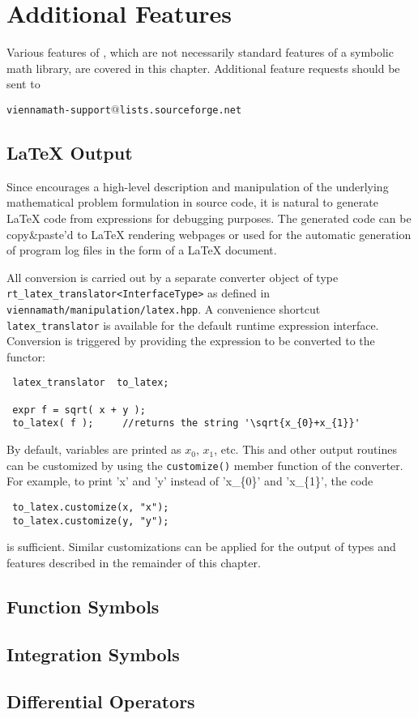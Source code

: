 
\chapter{Additional Features}
Various features of {\ViennaMath}, which are not necessarily standard features of a symbolic math library, are covered in this chapter.
Additional feature requests should be sent to
\begin{center}
\texttt{viennamath-support$@$lists.sourceforge.net} 
\end{center}

  \section{\LaTeX{} Output}
Since {\ViennaMath} encourages a high-level description and manipulation of the underlying mathematical problem formulation in source code, it is natural to
generate \LaTeX{} code from {\ViennaMath} expressions for debugging purposes. The generated code can be copy\&paste'd to LaTeX rendering webpages or used for
the automatic generation of program log files in the form of a \LaTeX{} document.

All conversion is carried out by a separate converter object of type \lstinline|rt_latex_translator<InterfaceType>| as defined in
\lstinline|viennamath/manipulation/latex.hpp|. A convenience shortcut \lstinline|latex_translator| is available for the default runtime expression interface.
Conversion is triggered by providing the expression to be converted to the functor:
\begin{lstlisting}
 latex_translator  to_latex;

 expr f = sqrt( x + y );
 to_latex( f );     //returns the string '\sqrt{x_{0}+x_{1}}'
\end{lstlisting}
By default, variables are printed as $x_0$, $x_1$, etc. This and other output routines can be customized by using the \lstinline|customize()| member function
of the converter. For example, to print 'x' and 'y' instead of 'x\_\{0\}' and 'x\_\{1\}', the code
\begin{lstlisting}
 to_latex.customize(x, "x");
 to_latex.customize(y, "y");
\end{lstlisting}
is sufficient. Similar customizations can be applied for the output of types and features described in the remainder of this chapter.


  \section{Function Symbols}


  \section{Integration Symbols}


  \section{Differential Operators}
